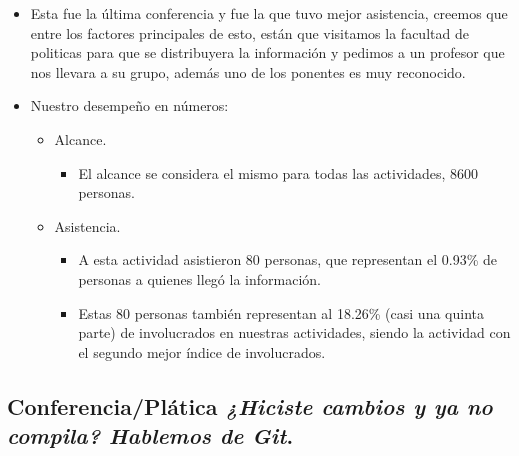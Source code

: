 \documentclass[a4paper,11pt]{article}                 %
\begin{document}
  \begin{itemize}
    \item Esta fue la última conferencia y fue la que tuvo mejor asistencia, creemos que entre los factores principales de esto, están que visitamos la facultad de politicas para que se distribuyera la información y pedimos a un profesor que nos llevara a su grupo, además uno de los ponentes es muy reconocido.
    
    \item Nuestro desempeño en números:
    
    \begin{itemize}
    \item Alcance.
    \begin{itemize}
      \item El alcance se considera el mismo para todas las actividades, 8600 personas.
    \end{itemize}

    \item Asistencia.
    \begin{itemize}
      \item A esta actividad asistieron 80 personas, que representan el 0.93\% de personas a quienes llegó la información.
      \item Estas 80 personas también representan al 18.26\% (casi una quinta parte) de involucrados en nuestras actividades, siendo la actividad con el segundo mejor índice de involucrados. 
    \end{itemize}
    \end{itemize} 
    
  \end{itemize}
  
  \subsection{Conferencia/Plática \textit{¿Hiciste cambios y ya no compila? Hablemos de Git}.} 
  
\end{document}
